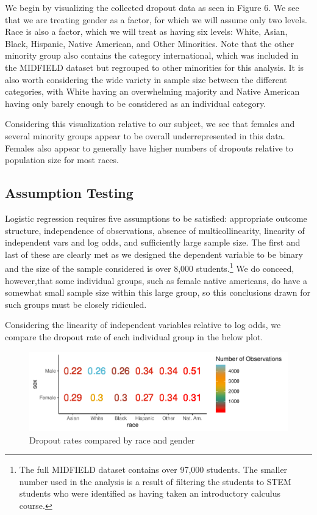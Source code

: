 \documentclass[]{article}
\begin{document}
We begin by visualizing the collected dropout data as seen in Figure 6.
We see that we are treating gender as a factor, for which we will assume
only two levels. Race is also a factor, which we will treat as having
six levels: White, Asian, Black, Hispanic, Native American, and Other
Minorities. Note that the other minority group also contains the
category international, which was included in the MIDFIELD dataset but
regrouped to other minorities for this analysis. It is also worth
considering the wide variety in sample size between the different
categories, with White having an overwhelming majority and Native
American having only barely enough to be considered as an individual
category.

Considering this visualization relative to our subject, we see that
females and several minority groups appear to be overall
underrepresented in this data. Females also appear to generally have
higher numbers of dropouts relative to population size for most races.

\subsection{Assumption Testing}\label{assumption-testing}

Logistic regression requires five assumptions to be satisfied:
appropriate outcome structure, independence of observations, absence of
multicollinearity, linearity of independent vars and log odds, and
sufficiently large sample size. \cite{glmassumptions} The first and last
of these are clearly met as we designed the dependent variable to be
binary and the size of the sample considered is over 8,000
students.\footnote{The full MIDFIELD dataset contains over 97,000 students. The smaller number used in the analysis is a result of filtering the students to STEM students who were identified as having taken an introductory calculus course.}
We do conceed, however,that some individual groups, such as female
native americans, do have a somewhat small sample size within this large
group, so this conclusions drawn for such groups must be closely
ridiculed.

Considering the linearity of independent variables relative to log odds,
we compare the dropout rate of each individual group in the below plot.

\begin{figure}
\centering
\includegraphics{Stat_461_Final_Project_Report_files/figure-latex/secondplot-1.pdf}
\caption{Dropout rates compared by race and gender}
\end{figure}
\end{document}
